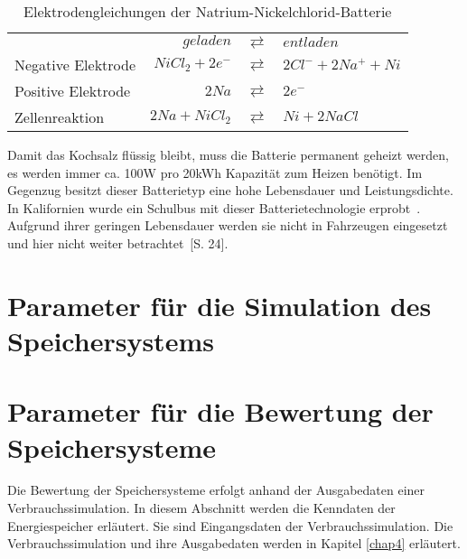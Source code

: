 \begin{table}\centering %
	\begin{tabularx}{\linewidth}{XrcX}
		\toprule
		&       $geladen$ & $\rightleftarrows$ & $entladen$           \\
		Negative Elektrode & $NiCl_2 + 2e^-$ & $\rightleftarrows$ & $2Cl^- + 2Na^+ + Ni$ \\
		Positive Elektrode &           $2Na$ & $\rightleftarrows$ & $2e^-$               \\ \midrule
		Zellenreaktion     &  $2Na + NiCl_2$ & $\rightleftarrows$ & $Ni + 2NaCl$ \\ \bottomrule
	\end{tabularx}
	\caption{Elektrodengleichungen der Natrium-Nickelchlorid-Batterie}
	\label{ZEBRA}
\end{table}

Damit das Kochsalz flüssig bleibt, muss die Batterie permanent geheizt werden, es werden immer ca. 100W pro 20kWh Kapazität zum Heizen benötigt. Im Gegenzug besitzt dieser Batterietyp eine hohe Lebensdauer und Leistungsdichte. In Kalifornien wurde ein Schulbus mit dieser Batterietechnologie erprobt~\cite{Electric-Transportation-Department:2004}. Aufgrund ihrer geringen Lebensdauer werden sie nicht in Fahrzeugen eingesetzt und hier nicht weiter betrachtet~\cite{Schimke:2012}[S. 24].

\section{Parameter für die Simulation des Speichersystems}

\section{Parameter für die Bewertung der Speichersysteme}
Die Bewertung der Speichersysteme erfolgt anhand der Ausgabedaten einer Verbrauchssimulation. In diesem Abschnitt werden die Kenndaten der Energiespeicher erläutert. Sie sind Eingangsdaten der Verbrauchssimulation. Die Verbrauchssimulation und ihre Ausgabedaten werden in Kapitel \ref{chap4} erläutert.

